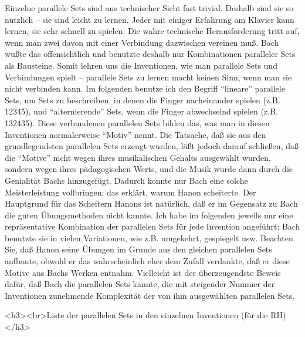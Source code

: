 Einzelne parallele Sets sind aus technischer Sicht fast trivial.
Deshalb sind sie so nützlich -- sie sind leicht zu lernen.
Jeder mit einiger Erfahrung am Klavier kann lernen, sie sehr schnell zu spielen.
Die wahre technische Herausforderung tritt auf, wenn man zwei davon mit einer Verbindung dazwischen vereinen muß.
Bach wußte das offensichtlich und benutzte deshalb nur Kombinationen paralleler Sets als Bausteine.
Somit lehren uns die Inventionen, wie man parallele Sets und Verbindungen spielt -- parallele Sets zu lernen macht keinen Sinn, wenn man sie nicht verbinden kann.
Im folgenden benutze ich den Begriff \enquote{lineare} parallele Sets, um Sets zu beschreiben, in denen die Finger nacheinander spielen (z.B. 12345), und \enquote{alternierende} Sets, wenn die Finger abwechselnd spielen (z.B. 132435).
Diese verbundenen parallelen Sets bilden das, was man in diesen Inventionen normalerweise \enquote{Motiv} nennt.
Die Tatsache, daß sie aus den grundlegendsten parallelen Sets erzeugt wurden, läßt jedoch darauf schließen, daß die \enquote{Motive} nicht wegen ihres musikalischen Gehalts ausgewählt wurden, sondern wegen ihres pädagogischen Werts, und die Musik wurde dann durch die Genialität Bachs hinzugefügt.
Dadurch konnte nur Bach eine solche Meisterleistung vollbringen; das erklärt, warum Hanon scheiterte.
Der Hauptgrund für das Scheitern Hanons ist natürlich, daß er im Gegensatz zu Bach die guten Übungsmethoden nicht kannte.
Ich habe im folgenden jeweils nur eine repräsentative Kombination der parallelen Sets für jede Invention angeführt; Bach benutzte sie in vielen Variationen, wie z.B. umgekehrt, gespiegelt usw.
Beachten Sie, daß Hanon seine Übungen im Grunde aus den gleichen parallelen Sets aufbaute, obwohl er das wahrscheinlich eher dem Zufall verdankte, daß er diese Motive aus Bachs Werken entnahm.
Vielleicht ist der überzeugendste Beweis dafür, daß Bach die parallelen Sets kannte, die mit steigender Nummer der Inventionen zunehmende Komplexität der von ihm ausgewählten parallelen Sets.


\label{c1iii20ps}

<h3><br>Liste der parallelen Sets in den einzelnen Inventionen (für die RH)</h3>

